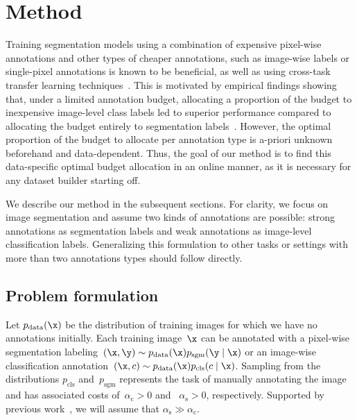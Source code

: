 \section{Method}
\label{sec:fullweak_method}

Training segmentation models using a combination of expensive pixel-wise annotations and other types of cheaper annotations, such as image-wise labels or single-pixel annotations is known to be beneficial, as well as using cross-task transfer learning techniques~. This is motivated by empirical findings showing that, under a limited annotation budget, allocating a proportion of the budget to inexpensive image-level class labels led to superior performance compared to allocating the budget entirely to segmentation labels~. However, the optimal proportion of the budget to allocate per annotation type is a-priori unknown beforehand and data-dependent. Thus, the goal of our method is to find this data-specific optimal budget allocation in an online manner, as it is necessary for any dataset builder starting off.

We describe our method in the subsequent sections. For clarity, we focus on image segmentation and assume two kinds of annotations are possible: strong annotations as segmentation labels and weak annotations as image-level classification labels. Generalizing this formulation to other tasks or settings with more than two annotations types should follow directly.

\subsection{Problem formulation} 
Let $p_\textrm{data}(\x)$ be the distribution of training images for which we have no annotations initially. Each training image~$\x$ can be annotated with a pixel-wise segmentation labeling~{$(\x,\y)\sim{}p_\textrm{data}(\x)p_\textrm{sgm}(\y\mid\x)$} or an image-wise classification annotation~{$(\x,c)\sim{}p_\textrm{data}(\x)p_\textrm{cls}(c\mid\x)$}. 
Sampling from the distributions $p_\textrm{cls}$ and~$p_\textrm{sgm}$ represents the task of manually annotating the image and has associated costs of~$\alpha_\textrm{c}>0$ and ~$\alpha_\textrm{s}>0$, respectively. Supported by previous work~, we will assume that $\alpha_\textrm{s}\gg\alpha_\textrm{c}$.

